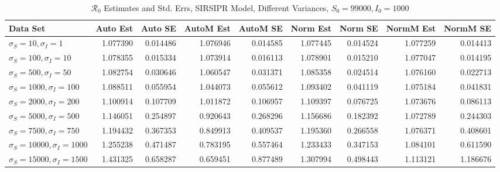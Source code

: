 \documentclass[12pt]{article}
\newcommand{\rr}{\ensuremath{\mathcal{R}_0}}
\begin{document}
\begin{table}[H]
	
	\caption{$\rr$ Estimates and Std. Errs, SIRSIPR Model,
		Different Variances, 
		$S_0 = 99000, I_0 = 1000$}
	\begin{footnotesize}
		\hskip -1.7cm
	\begin{tabular}{l|r|r|r|r|r|r|r|r}
		\hline
		Data Set & Auto Est & Auto SE & AutoM Est & AutoM SE & Norm Est & Norm SE & NormM Est & NormM SE\\
		\hline
		$\sigma_S = 10, \sigma_I = 1$ & 1.077390 & 0.014486 & 1.076946 & 0.014585 & 1.077445 & 0.014524 & 1.077259 & 0.014413\\
		\hline
		$\sigma_S = 100, \sigma_I = 10$ & 1.078355 & 0.015334 & 1.073914 & 0.016113 & 1.078901 & 0.015210 & 1.077047 & 0.014195\\
		\hline
		$\sigma_S = 500, \sigma_I = 50$ & 1.082754 & 0.030646 & 1.060547 & 0.031371 & 1.085358 & 0.024514 & 1.076160 & 0.022713\\
		\hline
		$\sigma_S = 1000, \sigma_I = 100$ & 1.088511 & 0.055954 & 1.044073 & 0.055612 & 1.093402 & 0.041119 & 1.075184 & 0.041831\\
		\hline
		$\sigma_S = 2000, \sigma_I = 200$ & 1.100914 & 0.107709 & 1.011872 & 0.106957 & 1.109397 & 0.076725 & 1.073676 & 0.086113\\
		\hline
		$\sigma_S = 5000, \sigma_I = 500$ & 1.146051 & 0.254897 & 0.920643 & 0.268296 & 1.156686 & 0.182392 & 1.072789 & 0.244303\\
		\hline
		$\sigma_S = 7500, \sigma_I = 750$ & 1.194432 & 0.367353 & 0.849913 & 0.409537 & 1.195360 & 0.266558 & 1.076371 & 0.408601\\
		\hline
		$\sigma_S = 10000, \sigma_I = 1000$ & 1.255238 & 0.471487 & 0.783195 & 0.557464 & 1.233433 & 0.347153 & 1.084101 & 0.611590\\
		\hline
		$\sigma_S = 15000, \sigma_I = 1500$ & 1.431325 & 0.658287 & 0.659451 & 0.877489 & 1.307994 & 0.498443 & 1.113121 & 1.186676\\
		\hline
	\end{tabular}
\end{footnotesize}
\end{table}
\end{document}
